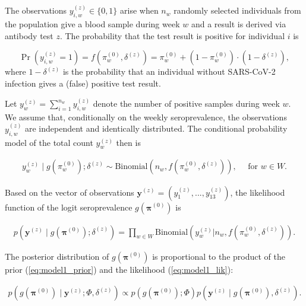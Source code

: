 \documentclass[aoas]{imsart}
\begin{document}
The observations $y^{(z)}_{i,w} \in \{0,1\}$ arise when $n_w$ randomly selected individuals from the population give a blood sample during week $w$ and a result is derived via antibody test $z$. The probability that the test result is positive for individual $i$ is 

\begin{equation}\label{eq:model1_prob1}
\Pr(y^{(z)}_{i,w} = 1) = f(\pi^{(0)}_{w}, \delta^{(z)}) = \pi^{(0)}_{w} + (1- \pi^{(0)}_{w}) \cdot ( 1 - \delta^{(z)}), 
\end{equation}
where $1 - \delta^{(z)}$ is the probability that an individual without SARS-CoV-2 infection gives a (false) positive test result. 

Let $y_w^{(z)} = \sum_{i=1}^{n_w} y^{(z)}_{i,w}$ denote the number of positive samples during week $w$. We assume that, conditionally on the weekly seroprevalence, the observations $y^{(z)}_{i,w}$ are independent and identically distributed. The conditional probability model of the total count $y_w^{(z)}$ then is

\begin{equation}\label{eq:model1_prob}
\begin{split}
y_w^{(z)} \mid g(\pi^{(0)}_{w}); \delta^{(z)} \sim \text{Binomial}(n_w, f(\pi^{(0)}_{w}, \delta^{(z)})), \quad \text{ for } w \in W.
\end{split}
\end{equation}

Based on the vector of observations $\mathbf{y}^{(z)} = (y_1^{(z)}, ..., y_{13}^{(z)})$, the likelihood function of the logit seroprevalence $g(\mathbf{\pi}^{(0)})$ is

\begin{equation}\label{eq:model1_lik}
\begin{split}
p(\mathbf{y}^{(z)} \mid g(\mathbf{\pi}^{(0)}); \delta^{(z)} ) = \prod_{w \in W} \text{Binomial}(y_w^{(z)} \vert n_w, f(\pi^{(0)}_{w}, \delta^{(z)})).
\end{split}
\end{equation}

The posterior distribution of $g(\mathbf{\pi}^{(0)})$ is proportional to the product of the prior (\ref{eq:model1_prior}) and the likelihood (\ref{eq:model1_lik}):

\begin{equation}\label{eq:model1_post}
\begin{split}
p(g(\mathbf{\pi}^{(0)}) \mid \mathbf{y}^{(z)}; \Phi, \delta^{(z)}) \propto p(g(\mathbf{\pi}^{(0)}) ; \Phi) p(\mathbf{y}^{(z)} \mid g(\mathbf{\pi}^{(0)}), \delta^{(z)} ).
\end{split}
\end{equation}
\end{document}
